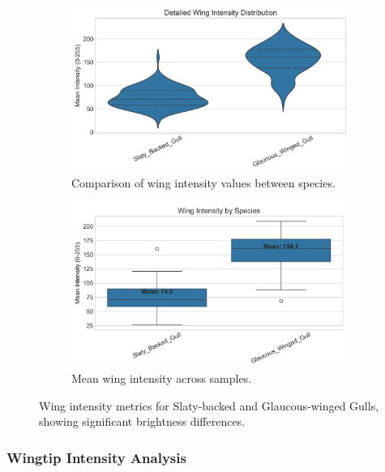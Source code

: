 \documentclass[a4paper,12pt]{report}
\begin{document}
\begin{figure}[H]
    \centering
    \begin{subfigure}[b]{0.48\textwidth}
        \centering
        \includegraphics[width=\textwidth]{images/REPORT_IMAGES_INTENSITY/I2/wing_intensity_analysis.png}
        \caption{Comparison of wing intensity values between species.}
        \label{fig:wing_intensity}
    \end{subfigure}
    \hfill
    \begin{subfigure}[b]{0.48\textwidth}
        \centering
        \includegraphics[width=\textwidth]{images/REPORT_IMAGES_INTENSITY/I2/WINGINTENSITY.png}
        \caption{Mean wing intensity across samples.}
        \label{fig:wing_intensity_means}
    \end{subfigure}
    \caption{Wing intensity metrics for Slaty-backed and Glaucous-winged Gulls, showing significant brightness differences.}
    \label{fig:wing_intensity_combined}
\end{figure}


\subsubsection{Wingtip Intensity Analysis}
\end{document}
